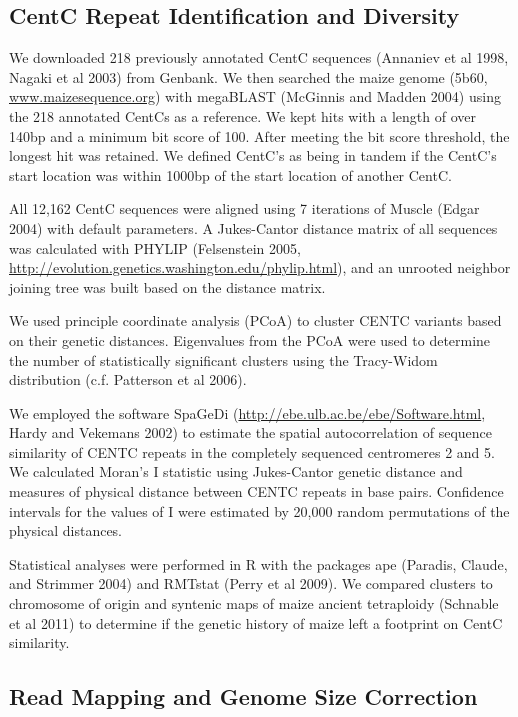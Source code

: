 \subsection*{CentC Repeat Identification and Diversity}

We downloaded 218 previously annotated CentC sequences (Annaniev et al 1998, Nagaki et al 2003) from Genbank.  We then searched the maize genome (5b60, \url{www.maizesequence.org}) with megaBLAST (McGinnis and Madden 2004) using the 218 annotated CentCs as a reference.  We kept hits with a length of over 140bp and a minimum bit score of 100.  After meeting the bit score threshold, the longest hit was retained.  We defined CentC’s as being in tandem if the CentC’s start location was within 1000bp of the start location of another CentC.
	
All 12,162 CentC sequences were aligned using 7 iterations of Muscle (Edgar 2004) with default parameters.  A Jukes-Cantor distance matrix of all sequences was calculated with PHYLIP (Felsenstein 2005, \url{http://evolution.genetics.washington.edu/phylip.html}), and an unrooted neighbor joining tree was built based on the distance matrix.  
	
We used principle coordinate analysis (PCoA) to cluster CENTC variants based on their genetic distances. Eigenvalues from the PCoA were used to determine the number of statistically significant clusters using the Tracy-Widom distribution (c.f. Patterson et al 2006).  
	
We employed the software SpaGeDi (\url{http://ebe.ulb.ac.be/ebe/Software.html}, Hardy and Vekemans 2002) to estimate the spatial autocorrelation of sequence similarity of CENTC repeats in the completely sequenced centromeres 2 and 5.  We calculated Moran’s I statistic using Jukes-Cantor genetic distance and measures of physical distance between CENTC repeats in base pairs.  Confidence intervals for the values of I were estimated by 20,000 random permutations of the physical distances.  
	
Statistical analyses were performed in R with the packages ape (Paradis, Claude, and Strimmer 2004) and RMTstat (Perry et al 2009).  We compared clusters to chromosome of origin and syntenic maps of maize ancient tetraploidy (Schnable et al 2011) to determine if the genetic history of maize left a footprint on CentC similarity.

\subsection*{Read Mapping and Genome Size Correction}
	
